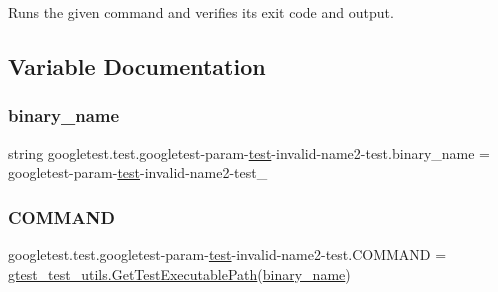 \begin{DoxyVerb}Runs the given command and verifies its exit code and output.\end{DoxyVerb}
 

\subsection{Variable Documentation}
\mbox{\label{namespacegoogletest_1_1test_1_1googletest-param-test-invalid-name2-test_a6aa273d4cc203f6cfc58d59bcfc9e8fe}} 
\subsubsection{\texorpdfstring{binary\_name}{binary\_name}}
{\footnotesize\ttfamily string googletest.\+test.\+googletest-\/param-\/\mbox{\hyperlink{_mutual_8h_a707ee03719e99670bf6cfdfd897b8456}{test}}-\/invalid-\/name2-\/test.\+binary\+\_\+name = \textquotesingle{}googletest-\/param-\/\mbox{\hyperlink{_mutual_8h_a707ee03719e99670bf6cfdfd897b8456}{test}}-\/invalid-\/name2-\/test\+\_\+\textquotesingle{}}

\mbox{\label{namespacegoogletest_1_1test_1_1googletest-param-test-invalid-name2-test_ab2f615cfc990c800a7be1b423698d0ea}} 
\subsubsection{\texorpdfstring{COMMAND}{COMMAND}}
{\footnotesize\ttfamily googletest.\+test.\+googletest-\/param-\/\mbox{\hyperlink{_mutual_8h_a707ee03719e99670bf6cfdfd897b8456}{test}}-\/invalid-\/name2-\/test.\+C\+O\+M\+M\+A\+ND = \mbox{\hyperlink{namespacegoogletest_1_1test_1_1gtest__test__utils_ac9af888c702350aac56b154a6af34098}{gtest\+\_\+test\+\_\+utils.\+Get\+Test\+Executable\+Path}}(\mbox{\hyperlink{namespacegoogletest_1_1test_1_1googletest-param-test-invalid-name2-test_a6aa273d4cc203f6cfc58d59bcfc9e8fe}{binary\+\_\+name}})}

